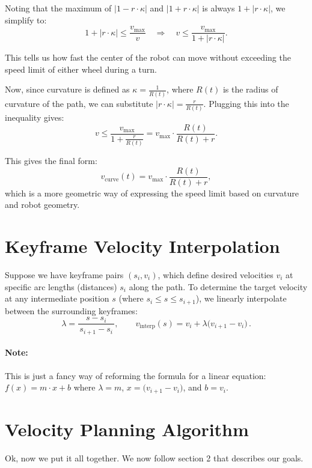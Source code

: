 \documentclass[11pt]{article}
\begin{document}
Noting that the maximum of \(|1 - r \cdot \kappa|\) and \(|1 + r \cdot \kappa|\) is always \(1 + |r \cdot \kappa|\), we simplify to:
\[
1 + |r \cdot \kappa| \le \frac{v_{\max}}{v} \quad \Rightarrow \quad v \le \frac{v_{\max}}{1 + |r \cdot \kappa|}.
\]

This tells us how fast the center of the robot can move without exceeding the speed limit of either wheel during a turn.

Now, since curvature is defined as \(\kappa = \frac{1}{R(t)}\), where \(R(t)\) is the radius of curvature of the path, we can substitute \(|r \cdot \kappa| = \frac{r}{R(t)}\). Plugging this into the inequality gives:
\[
v \le \frac{v_{\max}}{1 + \frac{r}{R(t)}} = v_{\max} \cdot \frac{R(t)}{R(t) + r}.
\]

This gives the final form:
\[
v_{\text{curve}}(t) = v_{\max} \cdot \frac{R(t)}{R(t) + r},
\]
which is a more geometric way of expressing the speed limit based on curvature and robot geometry.

\section{Keyframe Velocity Interpolation}

Suppose we have keyframe pairs \((s_i, v_i)\), which define desired velocities \(v_i\) at specific arc lengths (distances) \(s_i\) along the path. To determine the target velocity at any intermediate position \(s\) (where $s_i \le s \le s_{i+1}$), we linearly interpolate between the surrounding keyframes:
\[
\lambda = \frac{s - s_i}{\,s_{i+1} - s_i\,}, 
\qquad
v_{\text{interp}}(s) = v_i + \lambda\big(v_{i+1} - v_i\big)\,.
\]

\paragraph{Note:} This is just a fancy way of reforming the formula for a linear equation: \(f(x) = m \cdot x + b\) where \(\lambda = m\), \(x = (v_{i+1} - v_i\big)\), and \(b = v_i\).

\section{Velocity Planning Algorithm}

Ok, now we put it all together. We now follow section 2 that describes our goals. 
\end{document}
